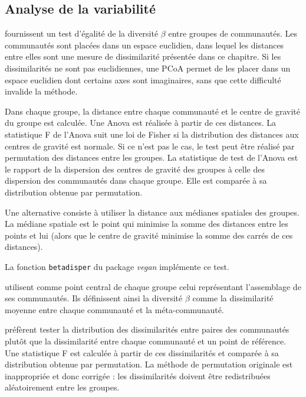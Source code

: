 \documentclass[
  11pt,
  french,
  a4paper,
  extrafontsizes,onecolumn,openright
  ]{memoir}
\begin{document}
\subsection{Analyse de la variabilité}\label{analyse-de-la-variabilituxe9}

\textcite{Anderson2006} fournissent un test d'égalité de la diversité \(\beta\) entre groupes de communautés.
Les communautés sont placées dans un espace euclidien, dans lequel les distances entre elles sont une mesure de dissimilarité présentée dans ce chapitre.
Si les dissimilarités ne sont pas euclidiennes, une PCoA permet de les placer dans un espace euclidien dont certains axes sont imaginaires, sans que cette difficulté invalide la méthode.

Dans chaque groupe, la distance entre chaque communauté et le centre de gravité du groupe est calculée.
Une Anova est réalisée à partir de ces distances.
La statistique F de l'Anova suit une loi de Fisher si la distribution des distances aux centres de gravité est normale.
Si ce n'est pas le cas, le test peut être réalisé par permutation des distances entre les groupes.
La statistique de test de l'Anova est le rapport de la dispersion des centres de gravité des groupes à celle des dispersion des communautés dans chaque groupe.
Elle est comparée à sa distribution obtenue par permutation.

Une alternative consiste à utiliser la distance aux médianes spatiales des groupes.
La médiane spatiale est le point qui minimise la somme des distances entre les points et lui (alors que le centre de gravité minimise la somme des carrés de ces distances).

La fonction \texttt{betadisper} du package \emph{vegan} implémente ce test.

\textcite{Ricotta2009a} utilisent comme point central de chaque groupe celui représentant l'assemblage de ses communautés.
Ils définissent ainsi la diversité \(\beta\) comme la dissimilarité moyenne entre chaque communauté et la méta-communauté.

\textcite{Bacaro2012} préfèrent tester la distribution des dissimilarités entre paires des communautés plutôt que la dissimilarité entre chaque communauté et un point de référence.
Une statistique F est calculée à partir de ces dissimilarités et comparée à sa distribution obtenue par permutation.
La méthode de permutation originale est inappropriée et donc corrigée \autocite{Bacaro2013a}: les dissimilarités doivent être redistribuées aléatoirement entre les groupes.
\end{document}
